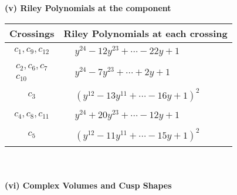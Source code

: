 \documentclass[1p]{elsarticle_modified}
\theoremstyle{definition}
\begin{document}
\newpage\renewcommand{\arraystretch}{1}
\flushleft \textbf{(v) Riley Polynomials at the component}\newline \\
\begin{tabular}{m{50pt}|m{274pt}}
Crossings & \hspace{64pt}Riley Polynomials at each crossing \\
\hline $$\begin{aligned}c_{1},c_{9},c_{12}\end{aligned}$$&$\begin{aligned}
&y^{24}-12 y^{23}+\cdots-22 y+1
\end{aligned}$\\
\hline $$\begin{aligned}c_{2},c_{6},c_{7}\\c_{10}\end{aligned}$$&$\begin{aligned}
&y^{24}-7 y^{23}+\cdots+2 y+1
\end{aligned}$\\
\hline $$\begin{aligned}c_{3}\end{aligned}$$&$\begin{aligned}
&(y^{12}-13 y^{11}+\cdots-16 y+1)^{2}
\end{aligned}$\\
\hline $$\begin{aligned}c_{4},c_{8},c_{11}\end{aligned}$$&$\begin{aligned}
&y^{24}+20 y^{23}+\cdots-12 y+1
\end{aligned}$\\
\hline $$\begin{aligned}c_{5}\end{aligned}$$&$\begin{aligned}
&(y^{12}-11 y^{11}+\cdots-15 y+1)^{2}
\end{aligned}$\\
\hline
\end{tabular}\\~\\
\newpage\flushleft \textbf{(vi) Complex Volumes and Cusp Shapes}
\end{document}
